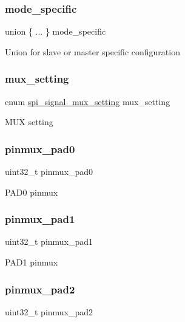 \subsubsection{\texorpdfstring{mode\_specific}{mode\_specific}}
{\footnotesize\ttfamily union \{ ... \}   mode\+\_\+specific}

Union for slave or master specific configuration \mbox{\label{structspi__config_a973f48b0b9271ae4ce74235c108a5d69}} 
\subsubsection{\texorpdfstring{mux\_setting}{mux\_setting}}
{\footnotesize\ttfamily enum \mbox{\hyperlink{group__asfdoc__sam0__sercom__spi__group_ga420e19efe4a923eb9ab6dc619a23c370}{spi\+\_\+signal\+\_\+mux\+\_\+setting}} mux\+\_\+setting}

M\+UX setting \mbox{\label{structspi__config_a36c58e420cf9b44d2f6cc8042f81b5d6}} 
\subsubsection{\texorpdfstring{pinmux\_pad0}{pinmux\_pad0}}
{\footnotesize\ttfamily uint32\+\_\+t pinmux\+\_\+pad0}

P\+A\+D0 pinmux \mbox{\label{structspi__config_acbc2a9a6d4bee7422a98b6af97e470dc}} 
\subsubsection{\texorpdfstring{pinmux\_pad1}{pinmux\_pad1}}
{\footnotesize\ttfamily uint32\+\_\+t pinmux\+\_\+pad1}

P\+A\+D1 pinmux \mbox{\label{structspi__config_ac2961331910efba2dd3a1f865bb34e74}} 
\subsubsection{\texorpdfstring{pinmux\_pad2}{pinmux\_pad2}}
{\footnotesize\ttfamily uint32\+\_\+t pinmux\+\_\+pad2}

